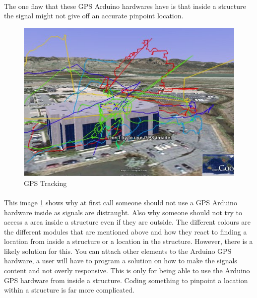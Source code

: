 \documentclass[12pt,a4paper]{article}
\begin{document}
\begin{appendices}
    \paragraph{}
      The one flaw that these GPS Arduino hardwares have is that inside a structure the signal might not give off an accurate pinpoint location.
      \begin{figure}[H]
        \centering
        \includegraphics[width=1\textwidth]{../assets/12-6-1-gpsinside.jpg}
        \caption{GPS Tracking}
        \label{fig:GPS Tracking}
      \end{figure}
    \paragraph{}
      This image \ref{fig:GPS Tracking} shows why at first call someone should not use a GPS Arduino hardware inside as signals are distraught. Also why someone should not try to access a area inside a structure even if they are outside. The different colours are the different modules that are mentioned above and how they react to finding a location from inside a structure or a location in the structure. However, there is a likely solution for this. You can attach other elements to the Arduino GPS hardware, a user will have to program a solution on how to make the signals content and not overly responsive. This is only for being able to use the Arduino GPS hardware from inside a structure. Coding something to pinpoint a location within a structure is far more complicated.


\end{appendices}
\end{document}
